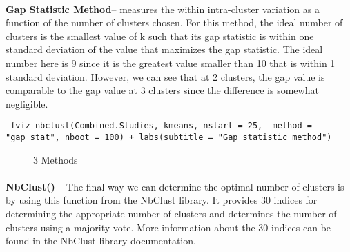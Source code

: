 \documentclass{article}
\begin{document}
\paragraph{}	\textbf{Gap Statistic Method}– measures the within intra-cluster variation as a function of the number of clusters chosen. For this method, the ideal number of clusters is the smallest value of k such that its gap statistic is within one standard deviation of the value that maximizes the gap statistic. The ideal number here is 9 since it is the greatest value smaller than 10 that is within 1 standard deviation. However, we can see that at 2 clusters, the gap value is comparable to the gap value at 3 clusters since the difference is somewhat negligible.
\begin{lstlisting}
 fviz_nbclust(Combined.Studies, kmeans, nstart = 25,  method = "gap_stat", nboot = 100) + labs(subtitle = "Gap statistic method")
\end{lstlisting}

\begin{figure}[htbp]
\centering

%
%
%

\centering
\caption{3 Methods}
\end{figure}
	
\paragraph{}	\textbf{NbClust()} – The final way we can determine the optimal number of clusters is by using this function from the NbClust library. It provides 30 indices for determining the appropriate number of clusters and determines the number of clusters using a majority vote. More information about the 30 indices can be found in the NbClust library documentation.
\end{document}

